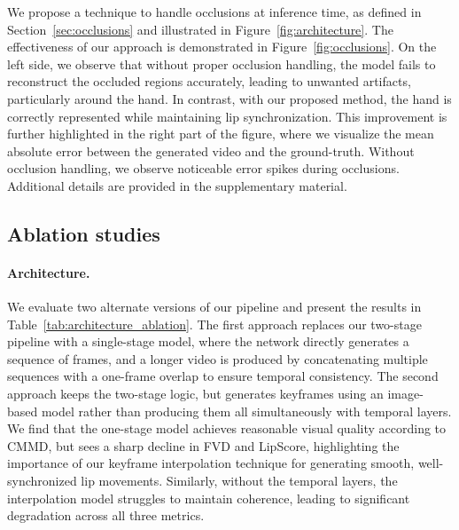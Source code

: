 We propose a technique to handle occlusions at inference time, as defined in Section~\ref{sec:occlusions} and illustrated in Figure~\ref{fig:architecture}. The effectiveness of our approach is demonstrated in Figure~\ref{fig:occlusions}. On the left side, we observe that without proper occlusion handling, the model fails to reconstruct the occluded regions accurately, leading to unwanted artifacts, particularly around the hand. In contrast, with our proposed method, the hand is correctly represented while maintaining lip synchronization. This improvement is further highlighted in the right part of the figure, where we visualize the mean absolute error between the generated video and the ground-truth. Without occlusion handling, we observe noticeable error spikes during occlusions. 
Additional details are provided in the supplementary material.

\subsection{Ablation studies}


\paragraph{Architecture.}

We evaluate two alternate versions of our pipeline and present the results in Table~\ref{tab:architecture_ablation}. The first approach replaces our two-stage pipeline with a single-stage model, where the network directly generates a sequence of frames, and a longer video is produced by concatenating multiple sequences with a one-frame overlap to ensure temporal consistency. The second approach keeps the two-stage logic,  but generates keyframes using an image-based model rather than producing them all simultaneously with temporal layers. We find that the one-stage model achieves reasonable visual quality according to CMMD, but sees a sharp decline in FVD and LipScore, highlighting the importance of our keyframe interpolation technique for generating smooth, well-synchronized lip movements. Similarly, without the temporal layers, the interpolation model struggles to maintain coherence, leading to significant degradation across all three metrics.

